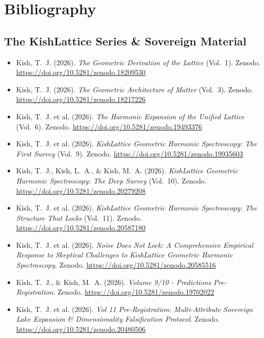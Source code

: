 \documentclass[11pt, letterpaper, openany]{book}
\begin{document}
\clearpage
\chapter*{Bibliography}

\section*{The KishLattice Series \& Sovereign Material}
\begin{itemize}
    \item Kish, T.~J. (2026). \textit{The Geometric Derivation of the Lattice} (Vol.~1). Zenodo. \url{https://doi.org/10.5281/zenodo.18209530}
    \item Kish, T.~J. (2026). \textit{The Geometric Architecture of Matter} (Vol.~3). Zenodo. \url{https://doi.org/10.5281/zenodo.18217226}
    \item Kish, T.~J. et al. (2026). \textit{The Harmonic Expansion of the Unified Lattice} (Vol.~6). Zenodo. \url{https://doi.org/10.5281/zenodo.19493376}
    \item Kish, T.~J. et al. (2026). \textit{KishLattice Geometric Harmonic Spectroscopy: The First Survey} (Vol.~9). Zenodo. \url{https://doi.org/10.5281/zenodo.19935603}
    \item Kish, T.~J., Kish, L.~A., \& Kish, M.~A. (2026). \textit{KishLattice Geometric Harmonic Spectroscopy: The Deep Survey} (Vol.~10). Zenodo. \url{https://doi.org/10.5281/zenodo.20279208}
    \item Kish, T.~J. et al. (2026). \textit{KishLattice Geometric Harmonic Spectroscopy: The Structure That Locks} (Vol.~11). Zenodo. \url{https://doi.org/10.5281/zenodo.20587180}
    \item Kish, T.~J. et al. (2026). \textit{Noise Does Not Lock: A Comprehensive Empirical Response to Skeptical Challenges to KishLattice Geometric Harmonic Spectroscopy}. Zenodo. \url{https://doi.org/10.5281/zenodo.20585516}
    \item Kish, T.~J., \& Kish, M.~A. (2026). \textit{Volume 9/10 - Predictions Pre-Registration}. Zenodo. \url{https://doi.org/10.5281/zenodo.19702022}
    \item Kish, T.~J. et al. (2026). \textit{Vol 11 Pre-Registration: Multi-Attribute Sovereign Lake Expansion \& Dimensionality Falsification Protocol}. Zenodo. \url{https://doi.org/10.5281/zenodo.20480506}

\end{itemize}
\end{document}
